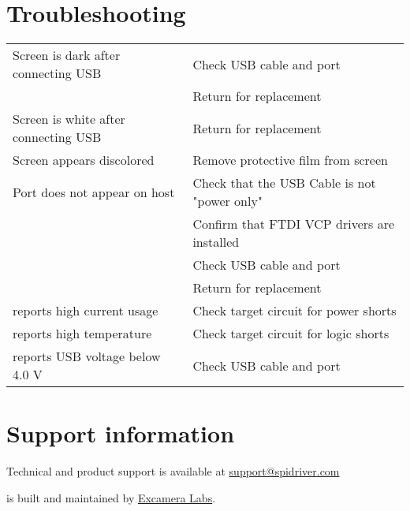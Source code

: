 \section{Troubleshooting}

\gap
\begin{tabular}{|l|l|}
\hline
Screen is dark after connecting USB  & Check USB cable and port \\
                                     & Return for replacement \\
\hline
Screen is white after connecting USB & Return for replacement \\
\hline
Screen appears discolored            & Remove protective film from screen\\
\hline
Port does not appear on host         & Check that the USB Cable is not "power only" \\
                                     & Confirm that FTDI VCP drivers are installed \\
                                     & Check USB cable and port \\
                                     & Return for replacement \\
\hline
\device{} reports high current usage & Check target circuit for power shorts\\
\hline
\device{} reports high temperature   & Check target circuit for logic shorts\\
\hline
\device{} reports USB voltage below 4.0 V & Check USB cable and port \\
\hline
\end{tabular}
\gap

\section{Support information}

Technical and product support is available at
\href{mailto:support@spidriver.com}{support@spidriver.com}

\device{} is built and maintained by
\href{https://excamera.com}{Excamera Labs}.

